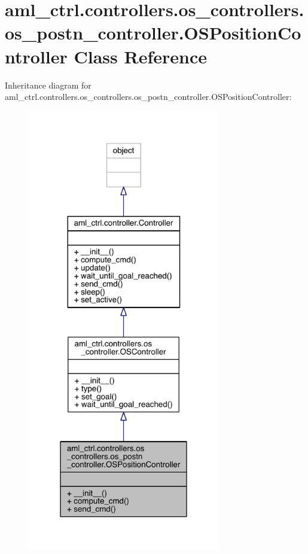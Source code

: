 \hypertarget{classaml__ctrl_1_1controllers_1_1os__controllers_1_1os__postn__controller_1_1_o_s_position_controller}{}\section{aml\+\_\+ctrl.\+controllers.\+os\+\_\+controllers.\+os\+\_\+postn\+\_\+controller.\+O\+S\+Position\+Controller Class Reference}
\label{classaml__ctrl_1_1controllers_1_1os__controllers_1_1os__postn__controller_1_1_o_s_position_controller}


Inheritance diagram for aml\+\_\+ctrl.\+controllers.\+os\+\_\+controllers.\+os\+\_\+postn\+\_\+controller.\+O\+S\+Position\+Controller\+:\nopagebreak
\begin{figure}[H]
\begin{center}
\leavevmode
\includegraphics[width=238pt]{classaml__ctrl_1_1controllers_1_1os__controllers_1_1os__postn__controller_1_1_o_s_position_controller__inherit__graph}
\end{center}
\end{figure}


